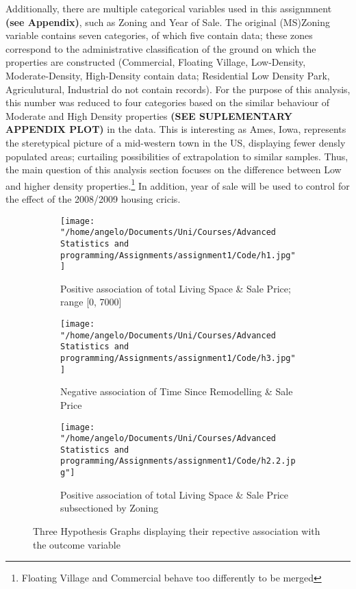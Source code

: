 \documentclass[a4paper]{article}
\begin{document}
Additionally, there are multiple categorical variables used in this assignmnent \textbf{(see Appendix)}, such as Zoning and Year of Sale. The original (MS)Zoning variable contains seven categories, of which five contain data; these zones correspond to the administrative classification of the ground on which the properties are constructed (Commercial, Floating Village, Low-Density, Moderate-Density, High-Density contain data; Residential Low Density Park, Agriculutural, Industrial do not contain records). For the purpose of this analysis, this number was reduced to four categories based on the similar behaviour of Moderate and High Density properties \textbf{(SEE SUPLEMENTARY APPENDIX PLOT)} in  the data. This is interesting as Ames, Iowa, represents the steretypical picture of a mid-western town in the US, displaying fewer densly populated areas; curtailing possibilities of extrapolation to similar samples. Thus, the main question of this analysis section focuses on the difference between Low and higher density properties.\footnote{Floating Village and Commercial behave too differently to be merged} In addition, year of sale will be used to control for the effect of the 2008/2009 housing cricis. 
\begin{figure}
\begin{adjustwidth}{-2cm}{-2cm}
\centering
\begin{subfigure}{.4\textwidth}
    \centering
    \texttt{[image: "/home/angelo/Documents/Uni/Courses/Advanced Statistics and programming/Assignments/assignment1/Code/h1.jpg"]}  
    \caption{Positive association of total Living Space \& Sale Price; range [0, 7000]}
    \label{SUBFIGURE LABEL 1}
\end{subfigure}
\begin{subfigure}{.4\textwidth}
    \centering
    \texttt{[image: "/home/angelo/Documents/Uni/Courses/Advanced Statistics and programming/Assignments/assignment1/Code/h3.jpg"]}  
    \caption{Negative association of Time Since Remodelling \& Sale Price}
    \label{SUBFIGURE LABEL 2}
\end{subfigure}
\begin{subfigure}{.4\textwidth}
    \centering
    \texttt{[image: "/home/angelo/Documents/Uni/Courses/Advanced Statistics and programming/Assignments/assignment1/Code/h2.2.jpg"]}  
    \caption{Positive association of total Living Space \& Sale Price subsectioned by Zoning}
    \label{SUBFIGURE LABEL 3}
\end{subfigure}
\small
\caption{Three Hypothesis Graphs displaying their repective association with the outcome variable}
\label{FIGURE LABEL}
\end{adjustwidth}
\end{figure}
\end{document}

